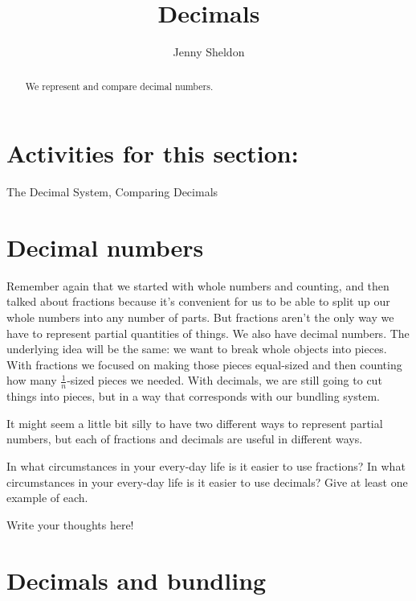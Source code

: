 \documentclass{ximera}
\title{Decimals}
\author{Jenny Sheldon}
\begin{document}
\begin{abstract}
We represent and compare decimal numbers.
\end{abstract}
\maketitle

\section{Activities for this section:} The Decimal System, Comparing Decimals

\section{Decimal numbers}

Remember again that we started with whole numbers and counting, and then talked about fractions because it's convenient for us to be able to split up our whole numbers into any number of parts. But fractions aren't the only way we have to represent partial quantities of things. We also have decimal numbers. The underlying idea will be the same: we want to break whole objects into pieces. With fractions we focused on making those pieces equal-sized and then counting how many $\frac{1}{n}$-sized pieces we needed. With decimals, we are still going to cut things into pieces, but in a way that corresponds with our bundling system. 

It might seem a little bit silly to have two different ways to represent partial numbers, but each of fractions and decimals are useful in different ways.
\begin{question}
In what circumstances in your every-day life is it easier to use fractions? In what circumstances in your every-day life is it easier to use decimals? Give at least one example of each.
\begin{freeResponse}
Write your thoughts here!
\end{freeResponse}
\end{question}

\section{Decimals and bundling}
\end{document}
